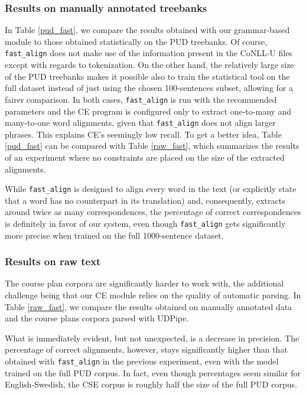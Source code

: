 \documentclass[11pt]{article}
\begin{document}
\subsubsection{Results on manually annotated treebanks} 
In Table \ref{pud_fast}, we compare the results obtained with our grammar-based module to those obtained statistically on the PUD treebanks. 
Of course, \texttt{fast\_align} does not make use of the information present in the CoNLL-U files except with regards to tokenization. 
On the other hand, the relatively large size of the PUD treebanks makes it possible also to train the statistical tool on the full dataset instead of just using the chosen 100-sentences subset, allowing for a fairer comparison. 
In both cases, \texttt{fast\_align} is run with the recommended parameters and the CE program is configured only to extract one-to-many and many-to-one word alignments, given that \texttt{fast\_align} does not align larger phrases. 
This explains CE's seemingly low recall.
To get a better idea, Table \ref{pud_fast} can be compared with Table \ref{raw_fast}, which summarizes the results of an experiment where no constraints are placed on the size of the extracted alignments.

While \texttt{fast\_align} is designed to align every word in the text (or explicitly state that a word has no counterpart in its translation) and, consequently, extracts around twice as many correspondences, the percentage of correct correspondences is definitely in favor of our system, even though \texttt{fast\_align} gets significantly more precise when trained on the full 1000-sentence dataset. 

\subsubsection{Results on raw text} \label{raw}
The course plan corpora are significantly harder to work with, the additional challenge being that our CE module relies on the quality of automatic parsing.
In Table \ref{raw_fast}, we compare the results obtained on manually annotated data and the course plans corpora parsed with UDPipe.  

What is immediately evident, but not unexpected, is a decrease in precision. 
The percentage of correct alignments, however, stays significantly higher than that obtained with \texttt{fast\_align} in the previous experiment, even with the model trained on the full PUD corpus. 
In fact, even though percentages seem similar for English-Swedish, the CSE corpus is roughly half the size of the full PUD corpus.
\end{document}
